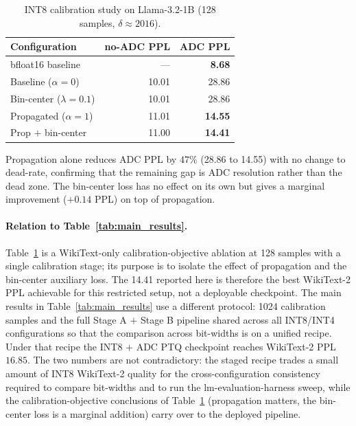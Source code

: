 \documentclass[a4paper,11pt,oneside]{article}
\theoremstyle{breakstyle}
\begin{document}
  \begin{table}[htbp]
    \centering
    \caption{INT8 calibration study on Llama-3.2-1B (128 samples,
      $\delta \approx 2016$).}
    \label{tab:int8}
    \renewcommand{\arraystretch}{1.2}
    \begin{tabular}{@{}lrr@{}}
      \toprule
      \textbf{Configuration} & \textbf{no-ADC PPL} & \textbf{ADC PPL} \\
      \midrule
      bfloat16 baseline           & ---   & \textbf{8.68}  \\
      Baseline ($\alpha = 0$)     & 10.01 & 28.86          \\
      Bin-center ($\lambda = 0.1$) & 10.01 & 28.86         \\
      Propagated ($\alpha = 1$)    & 11.01 & \textbf{14.55} \\
      Prop $+$ bin-center          & 11.00 & \textbf{14.41} \\
      \bottomrule
    \end{tabular}
  \end{table}

  Propagation alone reduces ADC PPL by $47\%$ (28.86 to 14.55) with
  no change to dead-rate, confirming that the remaining gap is ADC
  resolution rather than the dead zone.  The bin-center loss has no
  effect on its own but gives a marginal improvement ($+0.14$ PPL)
  on top of propagation.

  \paragraph{Relation to Table~\ref{tab:main_results}.}
  Table~\ref{tab:int8} is a WikiText-only calibration-objective
  ablation at 128 samples with a single calibration stage; its purpose
  is to isolate the effect of propagation and the bin-center auxiliary
  loss.  The 14.41 reported here is therefore the best WikiText-2 PPL
  achievable for this restricted setup, not a deployable checkpoint.
  The main results in Table~\ref{tab:main_results} use a different
  protocol: 1024 calibration samples and the full Stage A
  $+$ Stage B pipeline shared across all INT8/INT4 configurations so
  that the comparison across bit-widths is on a unified recipe.  Under
  that recipe the INT8 $+$ ADC PTQ checkpoint reaches WikiText-2 PPL
  $16.85$.  The two numbers are not contradictory: the staged recipe
  trades a small amount of INT8 WikiText-2 quality for the
  cross-configuration consistency required to compare bit-widths and
  to run the lm-evaluation-harness sweep, while the
  calibration-objective conclusions of Table~\ref{tab:int8}
  (propagation matters, the bin-center loss is a marginal addition)
  carry over to the deployed pipeline.
\end{document}
